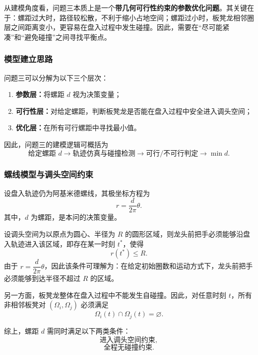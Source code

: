 \documentclass[12pt,a4paper]{ctexart}
\begin{document}
从建模角度看，问题三本质上是一个\textbf{带几何可行性约束的参数优化问题}。其关键在于：螺距过大时，路径较松散，不利于缩小占地空间；螺距过小时，板凳龙相邻圈层之间距离变小，更容易在盘入过程中发生碰撞。因此，需要在“尽可能紧凑”和“避免碰撞”之间寻找平衡点。

\subsubsection{模型建立思路}
问题三可以分解为以下三个层次：

\begin{enumerate}
    \item \textbf{参数层：}将螺距 $d$ 视为决策变量；
    \item \textbf{可行性层：}对给定螺距，判断板凳龙是否能在盘入过程中安全进入调头空间；
    \item \textbf{优化层：}在所有可行螺距中寻找最小值。
\end{enumerate}

因此，问题三的建模逻辑可概括为
\[
\text{给定螺距 } d \longrightarrow \text{轨迹仿真与碰撞检测} \longrightarrow \text{可行/不可行判定} \longrightarrow \min d.
\]

\subsubsection{螺线模型与调头空间约束}
设盘入轨迹仍为阿基米德螺线，其极坐标方程为
\begin{equation}
r=\frac{d}{2\pi}\theta.
\end{equation}
其中，$d$ 为螺距，是本问的决策变量。

设调头空间为以原点为圆心、半径为 $R$ 的圆形区域，则龙头前把手必须能够沿盘入轨迹进入该区域，即存在某一时刻 $t^\ast$，使得
\begin{equation}
r(t^\ast)\le R.
\end{equation}
由于 $r=\dfrac{d}{2\pi}\theta$，因此该条件可理解为：在给定初始圈数和运动方式下，龙头前把手必须能够到达半径不超过 $R$ 的区域。

另一方面，板凳龙整体在盘入过程中不能发生自碰撞。因此，对任意时刻 $t$，所有非相邻板凳对 $(\Omega_i,\Omega_j)$ 必须满足
\begin{equation}
\Omega_i(t)\cap\Omega_j(t)=\varnothing.
\end{equation}

综上，螺距 $d$ 需同时满足以下两类条件：
\begin{equation}
\text{进入调头空间约束},
\end{equation}
\begin{equation}
\text{全程无碰撞约束}.
\end{equation}
\end{document}

